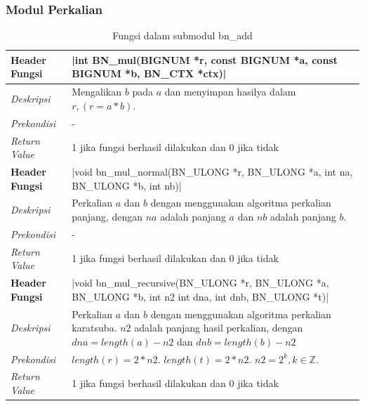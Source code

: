 \subsubsection{Modul Perkalian}
\begin{table}[h]
  \caption{Fungsi dalam submodul bn\_add}
  \begin{tabular}{R{2.5cm}L{10.5cm}}
    \toprule
    \textbf{Header Fungsi} & |int BN_mul(BIGNUM *r, const BIGNUM *a, const BIGNUM *b, BN_CTX *ctx)|                                                                                                \\ \midrule
    \textit{Deskripsi}     & Mengalikan $b$ pada $a$ dan menyimpan hasilya dalam $r, (r = a * b)$.                                                                                                 \\
    \textit{Prekondisi}    & -                                                                                                                                                                     \\
    \textit{Return Value}  & 1 jika fungsi berhasil dilakukan dan 0 jika tidak
    \\ \bottomrule
    \textbf{Header Fungsi} & |void bn_mul_normal(BN_ULONG *r, BN_ULONG *a, int na, BN_ULONG *b, int nb)|                                                                                           \\ \midrule
    \textit{Deskripsi}     & Perkalian $a$ dan $b$ dengan menggunakan algoritma perkalian panjang, dengan $na$ adalah panjang $a$ dan $nb$ adalah panjang $b$.                                     \\
    \textit{Prekondisi}    & -                                                                                                                                                                     \\
    \textit{Return Value}  & 1 jika fungsi berhasil dilakukan dan 0 jika tidak
    \\ \bottomrule
    \textbf{Header Fungsi} & |void bn_mul_recursive(BN_ULONG *r, BN_ULONG *a, BN_ULONG *b, int n2 int dna, int dnb, BN_ULONG *t)|                                                                  \\ \midrule
    \textit{Deskripsi}     & Perkalian $a$ dan $b$ dengan menggunakan algoritma perkalian karatsuba. $n2$ adalah panjang hasil perkalian, dengan $dna = length(a) - n2$ dan $dnb = length(b) - n2$ \\
    \textit{Prekondisi}    & $length(r) = 2*n2$. $ length(t) = 2*n2$. $n2 = 2^k, k \in \mathbb{Z}. $                                                                                               \\
    \textit{Return Value}  & 1 jika fungsi berhasil dilakukan dan 0 jika tidak
    \\ \bottomrule
  \end{tabular}

\end{table}

